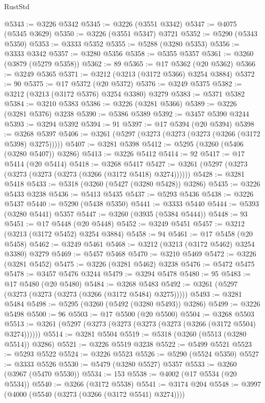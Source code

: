 \begin{lexlean}{RustStd}
\begin{coremodule}
@5343 := @3226 @5342
@5345 := @3226 (@3551 @3342)
@5347 := @4075 (@5345 @3629)
@5350 := @3226 (@3551 @5347) @3721
@5352 := @5290 (@5343 @5350)
@5353 := @3333 @5352
@5355 := @5288 (@3280 @5353)
@5356 := @3333 @3342
@5357 := @3280 @5356
@5358 := @5355 @5357
@5361 := @3260 (@3879 (@5279 @5358))
@5362 := 89
@5365 := @17 @5362 (@20 @5362)
@5366 := @3249 @5365
@5371 := @3212 (@3213 (@3172 @5366) @3254 @3884)
@5372 := 90
@5375 := @17 @5372 (@20 @5372)
@5376 := @3249 @5375
@5382 := @3212 (@3213 (@3172 @5376) @3254 @3380) @3279
@5383 := @5371 @5382
@5384 := @3210 @5383
@5386 := @3226 (@3281 @5366)
@5389 := @3226 (@3281 @5376) @3238
@5390 := @5386 @5389
@5392 := @3457 @5390 @3244
@5393 := @3294 @5392
@5394 := 91
@5397 := @17 @5394 (@20 @5394)
@5398 := @3268 @5397
@5406 := @3261 (@5297 (@3273 (@3273 (@3273 (@3266 (@3172 @5398) @3275)))))
@5407 := @3281 @5398
@5412 := @5295 (@3260 (@5406 (@3280 @5407)) @3286)
@5413 := @3226 @5412
@5414 := 92
@5417 := @17 @5414 (@20 @5414)
@5418 := @3268 @5417
@5427 := @3261 (@5297 (@3273 (@3273 (@3273 (@3273 (@3266 (@3172 @5418) @3274))))))
@5428 := @3281 @5418
@5433 := @5318 (@3260 (@5427 (@3280 @5428)) @3286)
@5435 := @3226 @5433 @3238
@5436 := @5413 @5435
@5437 := @5293 @5436
@5438 := @3226 @5437
@5440 := @5290 (@5438 @5350)
@5441 := @3333 @5440
@5444 := @5393 (@3280 @5441) @5357
@5447 := @3260 (@3935 (@5384 @5444))
@5448 := 93
@5451 := @17 @5448 (@20 @5448)
@5452 := @3249 @5451
@5457 := @3212 (@3213 (@3172 @5452) @3254 @3884)
@5458 := 94
@5461 := @17 @5458 (@20 @5458)
@5462 := @3249 @5461
@5468 := @3212 (@3213 (@3172 @5462) @3254 @3380) @3279
@5469 := @5457 @5468
@5470 := @3210 @5469
@5472 := @3226 (@3281 @5452)
@5475 := @3226 (@3281 @5462) @3238
@5476 := @5472 @5475
@5478 := @3457 @5476 @3244
@5479 := @3294 @5478
@5480 := 95
@5483 := @17 @5480 (@20 @5480)
@5484 := @3268 @5483
@5492 := @3261 (@5297 (@3273 (@3273 (@3273 (@3266 (@3172 @5484) @3275)))))
@5493 := @3281 @5484
@5498 := @5295 (@3260 (@5492 (@3280 @5493)) @3286)
@5499 := @3226 @5498
@5500 := 96
@5503 := @17 @5500 (@20 @5500)
@5504 := @3268 @5503
@5513 := @3261 (@5297 (@3273 (@3273 (@3273 (@3273 (@3266 (@3172 @5504) @3274))))))
@5514 := @3281 @5504
@5519 := @5318 (@3260 (@5513 (@3280 @5514)) @3286)
@5521 := @3226 @5519 @3238
@5522 := @5499 @5521
@5523 := @5293 @5522
@5524 := @3226 @5523
@5526 := @5290 (@5524 @5350)
@5527 := @3333 @5526
@5530 := @5479 (@3280 @5527) @5357
@5533 := @3260 (@3967 (@5470 @5530))
@5534 := 153
@5538 := @4002 (@17 @5534 (@20 @5534))
@5540 := @3266 (@3172 @5538)
@5541 := @3174 @204
@5548 := @3997 (@4000 (@5540 (@3273 (@3266 (@3172 @5541) @3274))))

\end{coremodule}
\end{lexlean}
